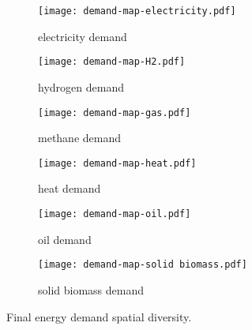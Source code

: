 \begin{figure}
    \centering
    \begin{subfigure}[t]{0.49\textwidth}
        \centering
        \caption{electricity demand}
        \label{fig:demand-space:electricity}
        \texttt{[image: demand-map-electricity.pdf]}
    \end{subfigure}
    \begin{subfigure}[t]{0.49\textwidth}
        \centering
        \caption{hydrogen demand}
        \label{fig:demand-space:hydrogen}
        \texttt{[image: demand-map-H2.pdf]}
    \end{subfigure}
    \begin{subfigure}[t]{0.49\textwidth}
        \centering
        \caption{methane demand}
        \label{fig:demand-space:methane}
        \texttt{[image: demand-map-gas.pdf]}
    \end{subfigure}
    \begin{subfigure}[t]{0.49\textwidth}
        \centering
        \caption{heat demand}
        \label{fig:demand-space:heat}
        \texttt{[image: demand-map-heat.pdf]}
    \end{subfigure}
    \begin{subfigure}[t]{0.49\textwidth}
        \centering
        \caption{oil demand}
        \label{fig:demand-space:oil}
        \texttt{[image: demand-map-oil.pdf]}
    \end{subfigure}
    \begin{subfigure}[t]{0.49\textwidth}
        \centering
        \caption{solid biomass demand}
        \label{fig:demand-space:biomass}
        \texttt{[image: demand-map-solid biomass.pdf]}
    \end{subfigure}
    \caption{Final energy demand spatial diversity.}
    \label{fig:demand-space}
\end{figure}
\restoregeometry













